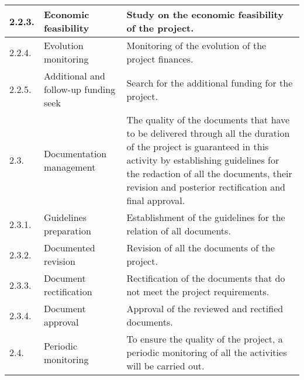\begin{longtable}[H]{l >{\raggedright\arraybackslash}p{4cm} p{8cm}}
	\midrule
	
	2.2.3. & Economic feasibility & Study on the economic feasibility of the project.\vspace{0.2cm} \\
	
	\midrule
	
	2.2.4. & Evolution monitoring & Monitoring of the evolution of the project finances.\vspace{0.2cm} \\
	
	\midrule
	
	2.2.5. & Additional and follow-up funding seek & Search for the additional funding for the project.\vspace{0.2cm} \\
	
	\midrule
	
	2.3. & Documentation management & The quality of the documents that have to be delivered through all the duration of the project is guaranteed in this activity by establishing guidelines for the redaction of all the documents, their revision and posterior rectification and final approval.\vspace{0.2cm} \\
	
	\midrule
	
	2.3.1. & Guidelines preparation & Establishment of the guidelines for the relation of all documents.\vspace{0.2cm} \\
	
	\midrule
	
	2.3.2. & Documented revision & Revision of all the documents of the project.\vspace{0.2cm} \\
	
	\midrule
	
	2.3.3. & Document rectification & Rectification of the documents that do not meet the project requirements.\vspace{0.2cm} \\
	
	\midrule
	
	2.3.4. & Document approval & Approval of the reviewed and rectified documents.\vspace{0.2cm} \\
	
	\midrule
	
	2.4. & Periodic monitoring & To ensure the quality of the project, a periodic monitoring of all the activities will be carried out.\vspace{0.2cm} \\
	

\end{longtable}
